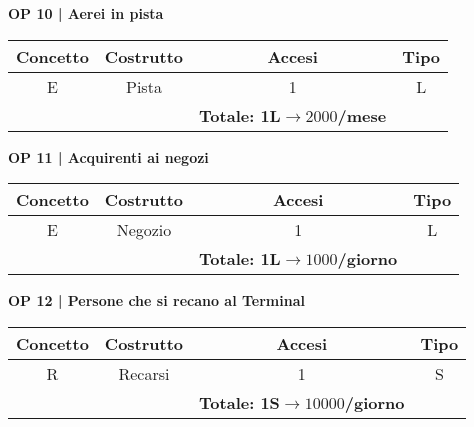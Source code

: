 \vspace{.6cm}


\textbf{\small OP 10 | Aerei in pista}\\

\begin{tabular}{ c c c c} %
	\hline
	\textbf{Concetto} & \textbf{Costrutto} & \textbf{Accesi} & \textbf{Tipo}\\
	\hline
	\textsf{\small E} & \textsf{\small Pista} & \textsf{\small 1} &  \textsf{\small L}\\
	\hline
	\textsf{\small } & \textsf{\small } & \textbf{Totale: 1L$\rightarrow 2000$/mese } \textsf{\small } & \textsf{\small }\\
	\hline
\end{tabular}

\vspace{.6cm}


\textbf{\small OP 11 | Acquirenti ai negozi}\\ %

\begin{tabular}{ c c c c}
	\hline
	\textbf{Concetto} & \textbf{Costrutto} & \textbf{Accesi} & \textbf{Tipo}\\
	\hline
	\textsf{\small E} & \textsf{\small Negozio} & \textsf{\small 1} &  \textsf{\small L}\\
	\hline
	\textsf{\small } & \textsf{\small } & \textbf{Totale: 1L$\rightarrow 1000$/giorno } \textsf{\small } & \textsf{\small }\\
	\hline
\end{tabular}

\vspace{.6cm}


\textbf{\small OP 12 | Persone che si recano al Terminal}\\

\begin{tabular}{ c c c c} %
	\hline
	\textbf{Concetto} & \textbf{Costrutto} & \textbf{Accesi} & \textbf{Tipo}\\
	\hline
	\textsf{\small R} & \textsf{\small Recarsi} & \textsf{\small 1} &  \textsf{\small S}\\
	\hline
	\textsf{\small } & \textsf{\small } & \textbf{Totale: 1S$\rightarrow 10000$/giorno } \textsf{\small } & \textsf{\small }\\ %
	\hline
\end{tabular}

